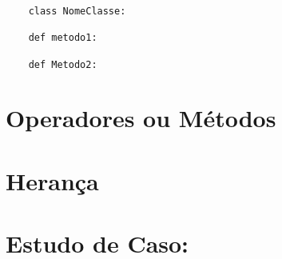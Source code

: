    \begin{lstlisting}
    class NomeClasse:

    def metodo1:

    def Metodo2:

    \end{lstlisting}

    \section{Operadores ou Métodos}


    \section{Herança}


    \section{Estudo de Caso: }
